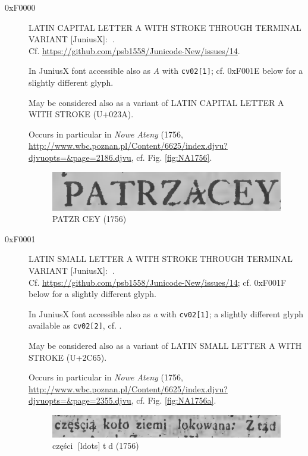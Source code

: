 \documentclass{article}
\newcommand{\Jglyph}[1]{{\relsize{2}\J#1}}
\begin{document}
\begin{description}
\item[0xF0000] LATIN CAPITAL LETTER A WITH STROKE THROUGH TERMINAL
  VARIANT [JuniusX]: \Jglyph{󰀀}.\\
  Cf. \url{https://github.com/psb1558/Junicode-New/issues/14}.
  
  In JuniusX font accessible also as \textit{A} with \texttt{cv02[1]};
  cf.  0xF001E  below for a slightly different glyph.

  May be considered also as a variant of LATIN CAPITAL LETTER A WITH
  STROKE (U+023A).

  Occurs in particular in \textit{Nowe Ateny} (1756,
  \url{http://www.wbc.poznan.pl/Content/6625/index.djvu?djvuopts=&page=2186.djvu},
  cf. Fig. \vref{fig:NA1756}.

  \begin{figure}[h]
    \includegraphics{img/00433085patrzacey}
    \caption{{\J PATZR󰀂CEY} (1756)}
    \label{fig:NA1756}
  \end{figure}

\item [0xF0001] LATIN SMALL LETTER A WITH STROKE THROUGH TERMINAL VARIANT [JuniusX]: 
  \Jglyph{󰀁}.\\ Cf. \url{https://github.com/psb1558/Junicode-New/issues/14};
  cf. 0xF001F below for a slightly different glyph.

  In JuniusX font accessible also as \textit{a} with \texttt{cv02[1]};
  a slightly different glyph available as \texttt{cv02[2]},
  cf. \autocite[p. 7]{baker20:_opent_featur_junius_junius}.


  May be considered also as a variant of LATIN SMALL LETTER A WITH
  STROKE (U+2C65).

  Occurs in particular in \textit{Nowe Ateny} (1756, \url{
    http://www.wbc.poznan.pl/Content/6625/index.djvu?djvuopts=&page=2355.djvu},
  cf. Fig. \vref{fig:NA1756a}.
 

  \begin{figure}[h]
    \includegraphics[width=1.3\textwidth]{img/00433254czescZtad.png}
    \caption{{\J części󰀁 [ldots] t󰀁d} (1756)}
    \label{fig:NA1756a}
  \end{figure}



\end{description}
\end{document}
